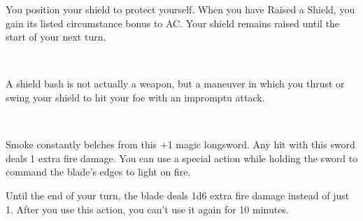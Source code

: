 \documentclass[paper=a7, DIV=15, fontsize=8pt]{scrartcl}
\begin{document}
You position your shield to protect yourself. When you have Raised a Shield, you gain its listed circumstance bonus to AC. Your shield remains raised until the start of your next turn.


\\

A shield bash is not actually a weapon, but a maneuver in which you thrust or swing your shield to hit your foe with an impromptu attack.


\\

Smoke constantly belches from this +1 magic longsword. Any hit with this sword deals 1 extra fire damage. You can use a special action while holding the sword to command the blade's edges to light on fire.



Until the end of your turn, the blade deals 1d6 extra fire damage instead of just 1. After you use this action, you can't use it again for 10 minutes.
\end{document}
